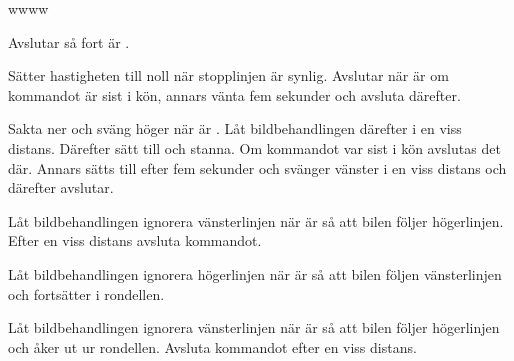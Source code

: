 \documentclass[tekniskrapport/tech.tex]{subfiles}
\begin{document}
\begin{labeling}{wwww}
    \item[\commIgnore] Avslutar så fort  är .
    \item[\commStop] Sätter hastigheten till noll när stopplinjen är synlig.
        Avslutar när  är  om kommandot är sist i
        kön, annars vänta fem sekunder och avsluta därefter.
    \item[\commPark] Sakta ner och sväng höger när  är
        . Låt bildbehandlingen därefter i en viss distans.
        Därefter sätt  till  och stanna. Om kommandot
        var sist i kön avslutas det där. Annars sätts  till
         efter fem sekunder och svänger vänster i en viss
        distans och därefter avslutar.
    \item[\commEnter] Låt bildbehandlingen ignorera vänsterlinjen när
         är  så att bilen följer högerlinjen. Efter
        en viss distans avsluta kommandot.
    \item[\commContinue] Låt bildbehandlingen ignorera högerlinjen när
         är  så att bilen följen vänsterlinjen och
        fortsätter i rondellen.
    \item[\commExit] Låt bildbehandlingen ignorera vänsterlinjen när 
        är  så att bilen följer högerlinjen och åker ut ur
        rondellen. Avsluta kommandot efter en viss distans.
\end{labeling}
\end{document}
